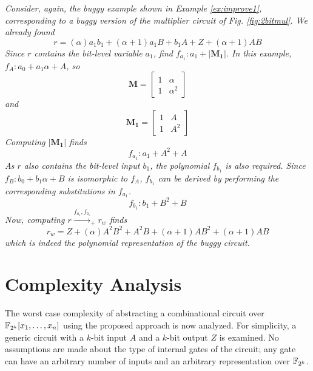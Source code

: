 \begin{Example}
\label{ex:improve2}
{\it 
Consider, again, the buggy example shown in Example \ref{ex:improve1}, 
corresponding to a buggy version of the multiplier circuit of
Fig. \ref{fig:2bitmul}. We already found 
\begin{equation}
r = (\alpha)a_1b_1 + (\alpha+1)a_1B+b_1A +
Z + (\alpha+1)AB
\end{equation}
Since $r$ contains the bit-level variable $a_1$, find 
$f_{a_1}: a_1+|\mathbf{M_1}|$. In this example, $f_A:a_0 + a_1 \alpha + A$, so
\begin{equation}
\mathbf{M}=
\begin{bmatrix}
1      &   \alpha           \\
1      &   \alpha^2         
\end{bmatrix}
\end{equation}
and
\begin{equation}
\mathbf{M_1}=
\begin{bmatrix}
1      &   A           \\
1      &   A^2
\end{bmatrix}
\end{equation}
Computing $|\mathbf{M_1}|$ finds
\begin{equation}
f_{a_1}: a_1 + A^2 + A
\end{equation}
As $r$ also contains the bit-level input $b_1$, the polynomial $f_{b_1}$ is also required. 
Since $f_B:b_0+b_1\alpha+B$ is 
isomorphic to $f_A$, $f_{b_1}$ can be derived by performing the corresponding 
substitutions in $f_{a_1}$.
\begin{equation}
f_{b_1}: b_1 + B^2 + B
\end{equation}
Now, computing $r \xrightarrow{f_{a_1},f_{b_1}} _+ r_w$ finds
\begin{equation}
r_w=Z+(\alpha) A^2 B^2+ A^2 B+(\alpha+1) A 
 B^2+(\alpha+1) A B
\end{equation}
which is indeed the polynomial representation of the buggy circuit.
}
\end{Example}

\section{Complexity Analysis}

The worst case complexity of abstracting a combinational circuit over ${\mathbb{F}}_{2^k}[x_1,\dots,x_n]$
using the proposed approach is now analyzed. 
For simplicity, a generic circuit with a $k$-bit input $A$ and a $k$-bit output $Z$ is
examined. No assumptions are made about the type of internal gates of the circuit; 
any gate can have an arbitrary number of inputs and an arbitrary representation over ${\mathbb{F}}_{2^k}$.

